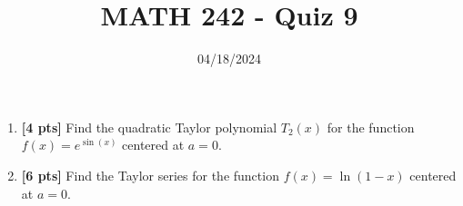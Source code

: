 \documentclass[12pt]{article}
\title{MATH 242 - Quiz 9}
\date{04/18/2024}
\begin{document}
\maketitle

\begin{enumerate}


\item \textbf{[4 pts]} Find the quadratic Taylor polynomial $T_2(x)$ for the function $f(x)=e^{\sin(x)}$ centered at $a=0$.
\newpage

\item \textbf{[6 pts]} Find the Taylor series for the function $f(x)=\ln(1-x)$ centered at $a=0$.


\end{enumerate}
\end{document}
